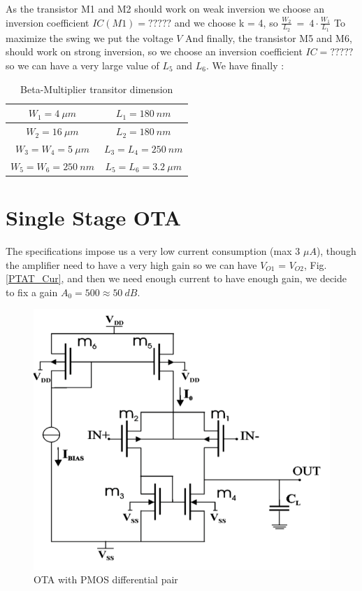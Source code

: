 \documentclass[11pt,a4paper]{report}
\begin{document}
As the transistor M1 and M2 should work on weak inversion we choose an inversion coefficient $IC(M1) = ?????$ and we choose k = 4, so $\frac{W_2}{L_2}~=~4\cdot\frac{W_1}{L_1} $
To maximize the swing we put the voltage $V$
And finally, the transistor M5 and M6, should work on strong inversion, so we choose an inversion coefficient $IC = ?????$ so we can have a very large value of $L_5$ and $L_6$. We have finally : 

\begin{table}[h]
  \begin{center}
  \begin{tabular}{|c|c|}\hline
    $W_1 = 4~\mu m$       & $L_1 = 180~ nm$ \\ \hline
    $W_2 =  16~ \mu m$       & $L_2 = 180~ nm$ \\ \hline
    $W_3 = W_4 = 5~ \mu m$ & $L_3 = L_4 = 250~ nm$  \\ \hline
    $W_5 = W_6 = 250~nm$ & $L_5 = L_6 = 3.2~\mu m$ \\ \hline
  \end{tabular}
\end{center}
\caption{Beta-Multiplier transitor dimension}
\end{table}

\newpage
\section{Single Stage OTA}

The specifications impose us a very low current consumption (max 3 $\mu A$), though the amplifier need to have a very high gain so we can have $V_{O1}$ = $V_{O2}$, Fig. \ref{PTAT_Cur}, and then we need enough current to have enough gain, we decide to fix a gain $A_0 = 500 \approx 50~dB$.

\begin{figure}[h]
  \begin{center}
    \includegraphics[scale=0.3]{photo/OTA_Pmos}
  \end{center}
  \caption{OTA with PMOS differential pair}
  \label{OTA}
\end{figure}
\end{document}
